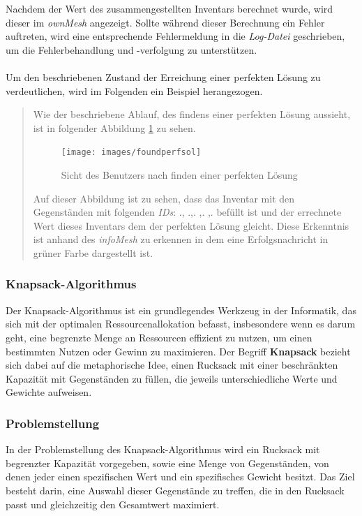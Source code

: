 Nachdem der Wert des zusammengestellten Inventars berechnet wurde, wird dieser im \textit{ownMesh} angezeigt. Sollte während
dieser Berechnung ein Fehler auftreten, wird eine entsprechende Fehlermeldung in die \textit{Log-Datei} geschrieben, um
die Fehlerbehandlung und -verfolgung zu unterstützen.\\
\\
Um den beschriebenen Zustand der Erreichung einer perfekten Lösung zu verdeutlichen, wird im Folgenden ein Beispiel herangezogen.

\begin{quote}
Wie der beschriebene Ablauf, des findens einer perfekten Lösung aussieht, ist in folgender Abbildung \ref{fig:foundperfsol}
zu sehen.
\begin{figure}[h]
\centering
\texttt{[image: images/foundperfsol]}
\caption{Sicht des Benutzers nach finden einer perfekten Lösung}
\label{fig:foundperfsol}
\end{figure}

Auf dieser Abbildung ist zu sehen, dass das Inventar mit den Gegenständen mit folgenden \textit{IDs}: ., .,. ,. ,. befüllt
ist und der errechnete Wert dieses Inventars dem der perfekten Lösung gleicht. Diese Erkenntnis ist anhand des \textit{infoMesh}
zu erkennen in dem eine Erfolgsnachricht in grüner Farbe dargestellt ist.
\end{quote}

\subsubsection{Knapsack-Algorithmus}
Der Knapsack-Algorithmus ist ein grundlegendes Werkzeug in der Informatik, das sich mit der optimalen Ressourcenallokation
befasst, insbesondere wenn es darum geht, eine begrenzte Menge an Ressourcen effizient zu nutzen, um einen bestimmten
Nutzen oder Gewinn zu maximieren. Der Begriff \textbf{Knapsack} bezieht sich dabei auf die metaphorische Idee, einen
Rucksack mit einer beschränkten Kapazität mit Gegenständen zu füllen, die jeweils unterschiedliche Werte und Gewichte
aufweisen.

\subsubsection*{Problemstellung}
In der Problemstellung des Knapsack-Algorithmus wird ein Rucksack mit begrenzter Kapazität vorgegeben, sowie eine Menge
von Gegenständen, von denen jeder einen spezifischen Wert und ein spezifisches Gewicht besitzt. Das Ziel besteht darin,
eine Auswahl dieser Gegenstände zu treffen, die in den Rucksack passt und gleichzeitig den Gesamtwert maximiert.

